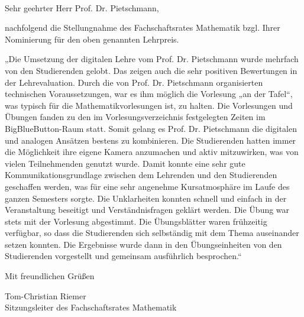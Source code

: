 \documentclass[nkz,einrichtung,usemycontact]{tucletter2019}
\begin{document}
	
\begin{letter}{%
\, \\
}

\opening{Sehr geehrter Herr Prof. Dr. Pietschmann,}

nachfolgend die Stellungnahme des Fachschaftsrates Mathematik bzgl. Ihrer Nominierung für den oben genannten Lehrpreis.

„Die Umsetzung der digitalen Lehre vom Prof. Dr. Pietschmann wurde mehrfach von den Studierenden gelobt. Das zeigen auch die sehr positiven Bewertungen in der Lehrevaluation. Durch die von Prof. Dr. Pietschmann organisierten technischen Voraussetzungen, war es ihm möglich die Vorlesung „an der Tafel“, was typisch für die Mathematikvorlesungen ist, zu halten. Die Vorlesungen und Übungen fanden zu den im Vorlesungsverzeichnis festgelegten Zeiten im BigBlueButton-Raum statt. Somit gelang es Prof. Dr. Pietschmann die digitalen und analogen Ansätzen bestens zu kombinieren. Die Studierenden hatten immer die Möglichkeit ihre eigene Kamera anzumachen und aktiv mitzuwirken, was von vielen Teilnehmenden genutzt wurde. Damit konnte eine sehr gute Kommunikationsgrundlage zwischen dem Lehrenden und den Studierenden geschaffen werden, was für eine sehr angenehme Kursatmosphäre im Laufe des ganzen Semesters sorgte. Die Unklarheiten konnten schnell und einfach in der Veranstaltung beseitigt und Verständnisfragen geklärt werden. Die Übung war stets mit der Vorlesung abgestimmt. Die Übungsblätter waren frühzeitig verfügbar, so dass die Studierenden sich selbständig mit dem Thema auseinander setzen konnten. Die Ergebnisse wurde dann in den Übungseinheiten von den Studierenden vorgestellt und gemeinsam ausführlich besprochen.“

\medskip

Mit freundlichen Grüßen

Tom-Christian Riemer \\
Sitzungsleiter des Fachschaftsrates Mathematik

\end{letter}
\end{document}

